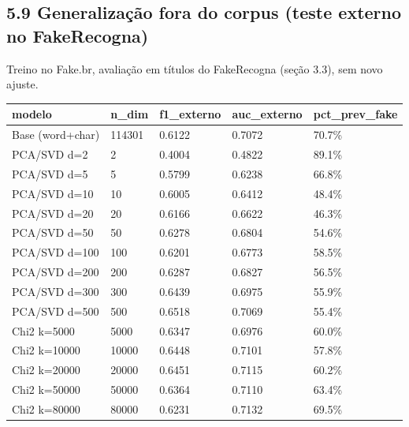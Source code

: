 \documentclass[
  brazilian,
  11pt,
]{article}
\newcounter{none} %
\begin{document}
\subsection{5.9 Generalização fora do corpus (teste externo no FakeRecogna)}\label{generalizauxe7uxe3o-fora-do-corpus-teste-externo-no-fakerecogna}

Treino no Fake.br, avaliação em títulos do FakeRecogna (seção 3.3), sem novo ajuste.

{\def\LTcaptype{none} %
\begin{longtable}[]{@{}lllll@{}}
\toprule\noalign{}
modelo & n\_dim & f1\_externo & auc\_externo & pct\_prev\_fake \\
\midrule\noalign{}
\endhead
\bottomrule\noalign{}
\endlastfoot
Base (word+char) & 114301 & 0.6122 & 0.7072 & 70.7\% \\
PCA/SVD d=2 & 2 & 0.4004 & 0.4822 & 89.1\% \\
PCA/SVD d=5 & 5 & 0.5799 & 0.6238 & 66.8\% \\
PCA/SVD d=10 & 10 & 0.6005 & 0.6412 & 48.4\% \\
PCA/SVD d=20 & 20 & 0.6166 & 0.6622 & 46.3\% \\
PCA/SVD d=50 & 50 & 0.6278 & 0.6804 & 54.6\% \\
PCA/SVD d=100 & 100 & 0.6201 & 0.6773 & 58.5\% \\
PCA/SVD d=200 & 200 & 0.6287 & 0.6827 & 56.5\% \\
PCA/SVD d=300 & 300 & 0.6439 & 0.6975 & 55.9\% \\
PCA/SVD d=500 & 500 & 0.6518 & 0.7069 & 55.4\% \\
Chi2 k=5000 & 5000 & 0.6347 & 0.6976 & 60.0\% \\
Chi2 k=10000 & 10000 & 0.6448 & 0.7101 & 57.8\% \\
Chi2 k=20000 & 20000 & 0.6451 & 0.7115 & 60.2\% \\
Chi2 k=50000 & 50000 & 0.6364 & 0.7110 & 63.4\% \\
Chi2 k=80000 & 80000 & 0.6231 & 0.7132 & 69.5\% \\
\end{longtable}
}
\end{document}
